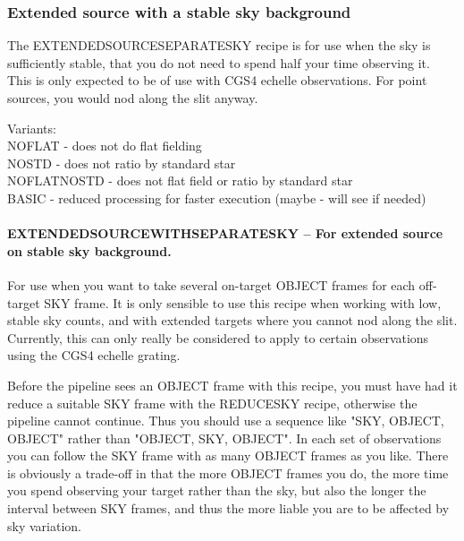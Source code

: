 \documentclass[twoside,11pt]{article}
\renewcommand{\_}{\texttt{\symbol{95}}}
\begin{document}
\subsubsection{Extended source with a stable sky background}

The EXTENDED\_SOURCE\_SEPARATE\_SKY recipe is for use when the sky is
sufficiently stable, that you do not need to spend half your time
observing it. This is only expected to be of use with CGS4 echelle
observations. For point sources, you would nod along the slit anyway.

Variants: \\
\_NOFLAT - does not do flat fielding \\
\_NOSTD - does not ratio by standard star \\
\_NOFLAT\_NOSTD - does not flat field or ratio by standard star \\
\_BASIC - reduced processing for faster execution (maybe - will see if needed) \\

\paragraph*{EXTENDED\_SOURCE\_WITH\_SEPARATE\_SKY -- For extended source on stable sky background.\label{EXTENDED_SOURCE_WITH_SEPARATE_SKY_--_For_extended_source_on_stable_sky_background_}}



\mbox{}

For use when you want to take several on-target OBJECT frames for each
off-target SKY frame. It is only sensible to use this recipe when
working with low, stable sky counts, and with extended targets where
you cannot nod along the slit. Currently, this can only really be
considered to apply to certain observations using the CGS4 echelle
grating.



Before the pipeline sees an OBJECT frame with this recipe, you must
have had it reduce a suitable SKY frame with the REDUCE\_SKY recipe,
otherwise the pipeline cannot continue. Thus you should use a sequence
like "SKY, OBJECT, OBJECT" rather than "OBJECT, SKY, OBJECT". In each
set of observations you can follow the SKY frame with as many OBJECT
frames as you like. There is obviously a trade-off in that the more
OBJECT frames you do, the more time you spend observing your target
rather than the sky, but also the longer the interval between SKY
frames, and thus the more liable you are to be affected by sky
variation.
\end{document}
